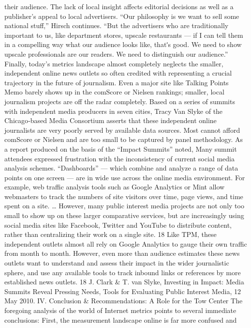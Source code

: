 their audience.
The lack of local insight affects editorial decisions as well as a publisher’s
appeal to local advertisers. ``Our philosophy is we want to sell some
national stuff,'' Hirsch continues. ``But the advertisers who are
traditionally important to us, like department stores, upscale restaurants
— if I can tell them in a compelling way what our audience looks like,
thatʹs good. We need to show upscale professionals are our readers. We
need to distinguish our audience.''
Finally, today’s metrics landscape almost completely neglects the smaller,
independent online news outlets so often credited with representing a
crucial trajectory in the future of journalism. Even a major site like Talking
Points Memo barely shows up in the comScore or Nielsen rankings;
smaller, local journalism projects are off the radar completely.
Based on a series of summits with independent media producers in seven
cities, Tracy Van Slyke of the Chicago‐based Media Consortium asserts
that these independent online journalists are very poorly served by
available data sources. Most cannot afford comScore or Nielsen and are
too small to be captured by panel methodology. As a report produced on
the basis of the ``Impact Summits'' noted,
Many summit attendees expressed frustration with the
inconsistency of current social media analysis schemes.
``Dashboards'' — which combine and analyze a range of data
points on one screen — are in wide use across the online media
environment. For example, web traffic analysis tools such as
Google Analytics or Mint allow webmasters to track the numbers of
site visitors over time, page views, and time spent on a site. \ldots 
However, many public interest media projects are not only too
small to show up on these larger comparative services, but are
increasingly using social media sites like Facebook, Twitter and
YouTube to distribute content, rather than centralizing their work
on a single site. 18
Like TPM, these independent outlets almost all rely on Google Analytics
to gauge their own traffic from month to month. However, even more
than audience estimates these news outlets want to understand and assess
their impact in the wider journalistic sphere, and use any available tools to
track inbound links or references by more established news outlets.
18 J. Clark & T. van Slyke, Investing in Impact: Media Summits Reveal Pressing
Needs, Tools for Evaluating Public Interest Media, 12 May 2010.
IV. Conclusion & Recommendations: A Role for the Tow Center
The foregoing analysis of the world of Internet metrics points to several
immediate conclusions:
First, the measurement landscape online is far more confused and
